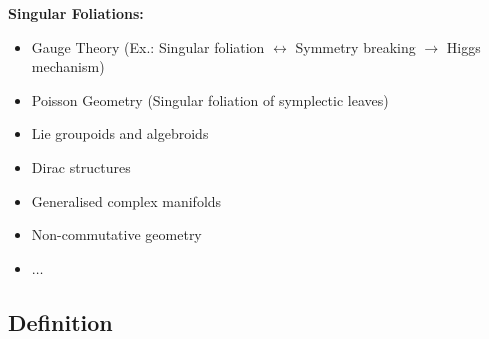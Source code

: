 \documentclass[hyperref={pdfpagelabels=false}]{beamer}
\newcommand\insertreferences{}
\theoremstyle{plain}
\theoremstyle{remark}
\begin{document}
{\begin{frame}
\end{frame}
}

{
\begin{frame}
\textbf{Singular Foliations:}

\begin{itemize}
	\item Gauge Theory \newline 
	(Ex.: Singular foliation $\leftrightarrow$ Symmetry breaking $\rightarrow$ Higgs mechanism)
	\item Poisson Geometry \newline (Singular foliation of symplectic leaves)
	\item Lie groupoids and algebroids
	\item Dirac structures
	\item Generalised complex manifolds
	\item Non-commutative geometry
	\item $\dotsc$
\end{itemize}

\end{frame}
}

\renewcommand\insertreferences{{\tiny  Peter Stefan, Accessible sets, orbits, and foliations with singularities. \textit{Proc.\ London Math.\ Soc.}, 29, 1974.
\newline
Héctor J. Sussmann, Orbits of families of vector fields and integrability of distributions. \textit{Trans.\ Amer.\ Math.\ Soc.}, 180, 1973}}

\subsection{Definition}
\end{document}
